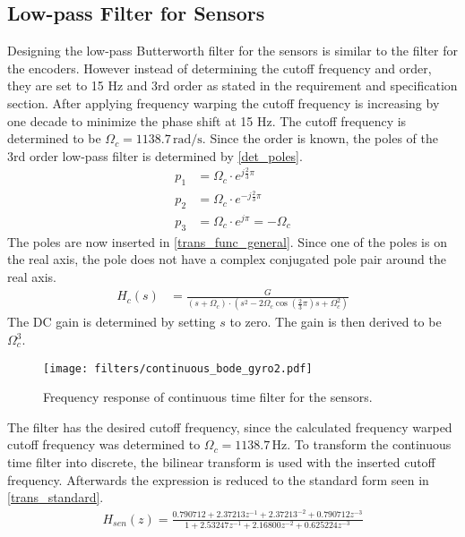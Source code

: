 \subsection{Low-pass Filter for Sensors}
Designing the low-pass Butterworth filter for the sensors is similar to the filter for the encoders. However instead of determining the cutoff frequency and order, they are set to 15 Hz and 3rd order as stated in the requirement and specification section. After applying frequency warping the cutoff frequency is increasing by one decade to minimize the phase shift at 15 Hz. The cutoff frequency is determined to be $\Omega_c = 1138.7 \, \text{rad/s}$. Since the order is known, the poles of the 3rd order low-pass filter is determined by \autoref{det_poles}.
\begin{align}
p_1 &= \Omega_c \cdot e^{j \frac{2}{3} \pi}\\
p_2 &= \Omega_c \cdot e^{-j \frac{2}{3} \pi}\\
p_3 &= \Omega_c \cdot e^{j\pi} = -\Omega_c 
\label{det_poles_res2}
\end{align}
The poles are now inserted in \autoref{trans_func_general}. Since one of the poles is on the real axis, the pole does not have a complex conjugated pole pair around the real axis. 
\begin{align}
H_c(s) &= \frac{G}{(s + \Omega_c) \cdot (s^2 - 2\Omega_c \cos (\frac{2}{3} \pi)s + \Omega_c^2)}
\label{trans_func_red_ins22}
\end{align}
The DC gain is determined by setting $s$ to zero. The gain is then derived to be $\Omega_c^3$. 
\begin{figure}[H]
    \centering
    \texttt{[image: filters/continuous\_bode\_gyro2.pdf]}
    \caption{Frequency response of continuous time filter for the sensors.}
    \label{fig:continuous_bode_gyro}
\end{figure}
The filter has the desired cutoff frequency, since the calculated frequency warped cutoff frequency was determined to $\Omega_c = 1138.7 \, \text{Hz}$. To transform the continuous time filter into discrete, the bilinear transform is used with the inserted cutoff frequency. Afterwards the expression is reduced to the standard form seen in \autoref{trans_standard}.
\begin{align}
H_{sen}(z) = \frac{0.790712+2.37213z^{-1}+2.37213^{-2}+0.790712z^{-3}}{1+2.53247z^{-1}+2.16800z^{-2}+0.625224z^{-3}}
\label{transfer_func_gyro}
\end{align}
\begin{where}
\\
\end{where}

